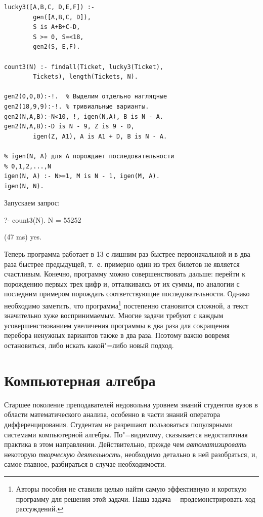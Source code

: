 \documentclass[a4paper,14pt, openany, twoside, final]{extbook} %
\begin{document}
\begin{verbatim}
lucky3([A,B,C, D,E,F]) :-
        gen([A,B,C, D]),
        S is A+B+C-D,
        S >= 0, S=<18,
        gen2(S, E,F).

count3(N) :- findall(Ticket, lucky3(Ticket),
        Tickets), length(Tickets, N).

gen2(0,0,0):-!.  % Выделим отдельно наглядные
gen2(18,9,9):-!. % тривиальные варианты.
gen2(N,A,B):-N<10, !, igen(N,A), B is N - A.
gen2(N,A,B):-D is N - 9, Z is 9 - D,
        igen(Z, A1), A is A1 + D, B is N - A.

% igen(N, A) для A порождает последовательности
% 0,1,2,...,N
igen(N, A) :- N>=1, M is N - 1, igen(M, A).
igen(N, N).
\end{verbatim}

\noindent{}Запускаем запрос:

\begin{proexp}
?- count3(N).
N = 55252

(47 ms) yes.
\end{proexp}


Теперь программа работает в 13 с лишним раз быстрее первоначальной и в два раза быстрее предыдущей, т.~е. примерно один из трех билетов не является счастливым. Конечно, программу можно совершенствовать дальше: перейти к порождению первых трех цифр и, отталкиваясь от их суммы, по аналогии с последним примером порождать соответствующие последовательности. Однако необходимо заметить, что программа\footnote{Авторы пособия не ставили целью найти самую эффективную и короткую программу для решения этой задачи. Наша задача~-- продемонстрировать ход рассуждений.} постепенно становится сложной, а текст значительно хуже воспринимаемым. Многие задачи требуют с каждым усовершенствованием увеличения программы в два раза для сокращения перебора ненужных вариантов также в два раза. Поэтому важно вовремя остановиться, либо искать какой"=либо новый подход.

\chapter{Компьютерная алгебра}
\label{cha:compalgebra}

Старшее поколение преподавателей недовольна уровнем знаний студентов вузов в области математического анализа, особенно в части знаний оператора дифференцирования.  Студентам не разрешают пользоваться популярными системами компьютерной алгебры.  По"=видимому, сказывается недостаточная практика в этом направлении.  Действительно, прежде чем \emph{автоматизировать} некоторую \emph{творческую деятельность}, необходимо детально в ней разобраться, и, самое главное, разбираться в случае необходимости.
\end{document}

